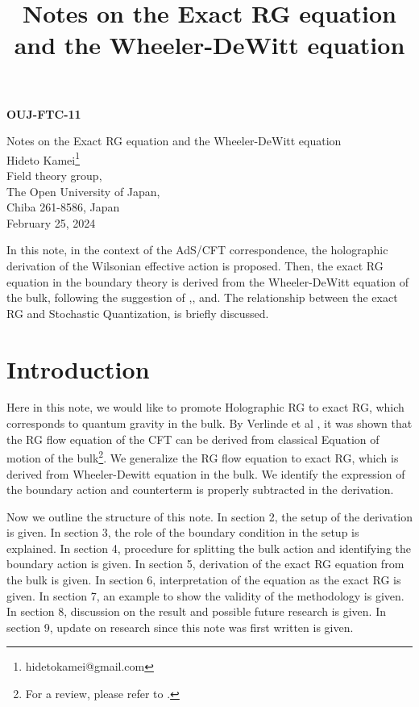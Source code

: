 \documentclass[12pt,epsbox]{article}
\title{Notes on the Exact RG equation and the Wheeler-DeWitt equation}
\numberwithin{equation}{section}
\begin{document}
  \begin{flushleft}
    {\bf OUJ-FTC-11}
  \end{flushleft}
  
  \begin{center}
    \vspace{37pt}
    {\LARGE Notes on the Exact RG equation and the Wheeler-DeWitt equation}\\[1em]
    \vspace{17pt}
    {\large Hideto Kamei\footnote{hidetokamei@gmail.com}}\\[0.5em]
    \vspace{17pt}
    {Field theory group, \\
  The Open University of Japan,\\
  Chiba 261-8586, Japan}\\[1em]
    \vspace{17pt}
    {\large February 25, 2024}
  \end{center}
  \vspace{17pt}

In this note, in the context of the AdS/CFT correspondence, the holographic derivation of the Wilsonian effective action is proposed. Then, the exact RG equation in the boundary theory is derived from the Wheeler-DeWitt equation of the bulk, following the suggestion of \cite{dVV},\cite{VV}, and\cite{Polchinski}. The relationship between the exact RG and Stochastic Quantization\cite{Parisi},\cite{Damgaard} is briefly discussed.

\section{Introduction}
Here in this note, we would like to promote Holographic RG to exact RG, which corresponds to quantum gravity in the bulk.
By Verlinde et al \cite{dVV}, it was shown that the RG flow equation of the CFT can be derived from classical Equation of motion of the bulk\footnote{For a review, please refer to \cite{Sakai}.}. We generalize the RG flow equation to exact RG, which is derived from Wheeler-Dewitt equation in the bulk. We identify the expression of the boundary action and counterterm is properly subtracted in the derivation.

Now we outline the structure of this note. In section 2, the setup of the derivation is given. In section 3, the role of the boundary condition in the setup is explained. In section 4, procedure for splitting the bulk action and identifying the boundary action is given. In section 5, derivation of the exact RG equation from the bulk is given. In section 6, interpretation of the equation as the exact RG is given. In section 7, an example to show the validity of the methodology is given. In section 8, discussion on the result and possible future research is given. In section 9, update on research since this note was first written is given.
\end{document}
